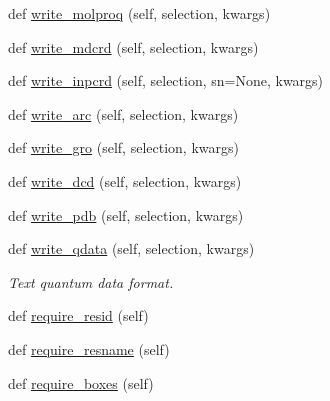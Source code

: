 \begin{DoxyCompactItemize}
def \hyperlink{classsrc_1_1molecule_1_1Molecule_ab74230360451f0feefcfceae3b292223}{write\+\_\+molproq} (self, selection, kwargs)
\item 
def \hyperlink{classsrc_1_1molecule_1_1Molecule_a94a0b29f772bb5e6e03383fd854ad70a}{write\+\_\+mdcrd} (self, selection, kwargs)
\item 
def \hyperlink{classsrc_1_1molecule_1_1Molecule_af975f93f5c43f518b84d0bd067c75604}{write\+\_\+inpcrd} (self, selection, sn=None, kwargs)
\item 
def \hyperlink{classsrc_1_1molecule_1_1Molecule_a5c04a001643a8165de635697f2d418f3}{write\+\_\+arc} (self, selection, kwargs)
\item 
def \hyperlink{classsrc_1_1molecule_1_1Molecule_accdd08d1cdef8a51da59e1fc2268c7d8}{write\+\_\+gro} (self, selection, kwargs)
\item 
def \hyperlink{classsrc_1_1molecule_1_1Molecule_a722ba2597f067fc042169926c0b37274}{write\+\_\+dcd} (self, selection, kwargs)
\item 
def \hyperlink{classsrc_1_1molecule_1_1Molecule_adea929913736e69b7af631dc0014a1e7}{write\+\_\+pdb} (self, selection, kwargs)
\item 
def \hyperlink{classsrc_1_1molecule_1_1Molecule_ac33547444f6fc81cae37ce37db9743ef}{write\+\_\+qdata} (self, selection, kwargs)
\begin{DoxyCompactList}\small\item\em Text quantum data format. \end{DoxyCompactList}\item 
def \hyperlink{classsrc_1_1molecule_1_1Molecule_af74bcae2931e36e08ff33037b1b0fa37}{require\+\_\+resid} (self)
\item 
def \hyperlink{classsrc_1_1molecule_1_1Molecule_a68eee3cd2b86790c0cb2954c8310bd29}{require\+\_\+resname} (self)
\item 
def \hyperlink{classsrc_1_1molecule_1_1Molecule_ab72729cb3e6b2ed086669142c1409ed4}{require\+\_\+boxes} (self)
\end{DoxyCompactItemize}
